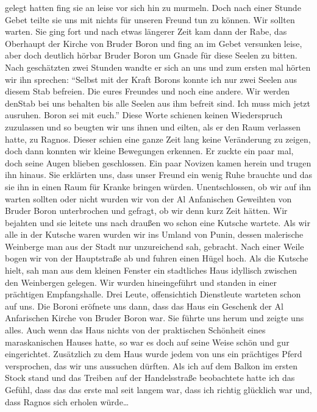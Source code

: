 gelegt hatten fing sie an leise vor sich hin zu murmeln. Doch nach einer Stunde Gebet teilte sie uns mit nichts für unseren Freund tun zu können. Wir sollten warten. Sie ging fort und nach etwas längerer Zeit kam dann der Rabe, das Oberhaupt der Kirche von Bruder Boron und fing an im Gebet versunken leise, aber doch deutlich hörbar Bruder Boron um Gnade für diese Seelen zu bitten. Nach geschätzten zwei Stunden wandte er sich an uns und zum ersten mal hörten wir ihn sprechen: ``Selbst mit der Kraft Borons konnte ich nur zwei Seelen aus diesem Stab befreien. Die eures Freundes und noch eine andere. Wir werden denStab bei uns behalten bis alle Seelen aus ihm befreit sind. Ich muss mich jetzt ausruhen. Boron sei mit euch.'' Diese Worte schienen keinen Wiederspruch zuzulassen und so beugten wir uns ihnen und eilten, als er den Raum verlassen hatte, zu Ragnos. Dieser schien eine ganze Zeit lang keine Veränderung zu zeigen, doch dann konnten wir kleine Bewegungen erkennen. Er zuckte ein paar mal, doch seine Augen blieben geschlossen. Ein paar Novizen kamen herein und trugen ihn hinaus. Sie erklärten uns, dass unser Freund ein wenig Ruhe brauchte und das sie ihn in einen Raum für Kranke bringen würden. Unentschlossen, ob wir auf ihn warten sollten oder nicht wurden wir von der Al Anfanischen Geweihten von Bruder Boron unterbrochen und gefragt, ob wir denn kurz Zeit hätten. Wir bejahten und sie leitete uns nach draußen wo schon eine Kutsche wartete. Als wir alle in der Kutsche waren wurden wir ins Umland von Punin, dessen malerische Weinberge man aus der Stadt nur unzureichend sah, gebracht. Nach einer Weile bogen wir von der Hauptstraße ab und fuhren einen Hügel hoch. Als die Kutsche hielt, sah man aus dem kleinen Fenster ein stadtliches Haus idyllisch zwischen den Weinbergen gelegen. Wir wurden hineingeführt und standen in einer prächtigen Empfangshalle. Drei Leute, offensichtich Dienstleute warteten schon auf uns. Die Boroni eröfnete uns dann, dass das Haus ein Geschenk der Al Anfarischen Kirche von Bruder Boron war. Sie führte uns herum und zeigte uns alles. Auch wenn das Haus nichts von der praktischen Schönheit eines maraskanischen Hauses hatte, so war es doch auf seine Weise schön und gur eingerichtet. Zusätzlich zu dem Haus wurde jedem von uns ein prächtiges Pferd versprochen, das wir uns aussuchen dürften. Als ich auf dem Balkon im ersten Stock stand und das Treiben auf der Handelsstraße beobachtete hatte ich das Gefühl, dass das das erste mal seit langem war, dass ich richtig glücklich war und, dass Ragnos sich erholen würde\dots

